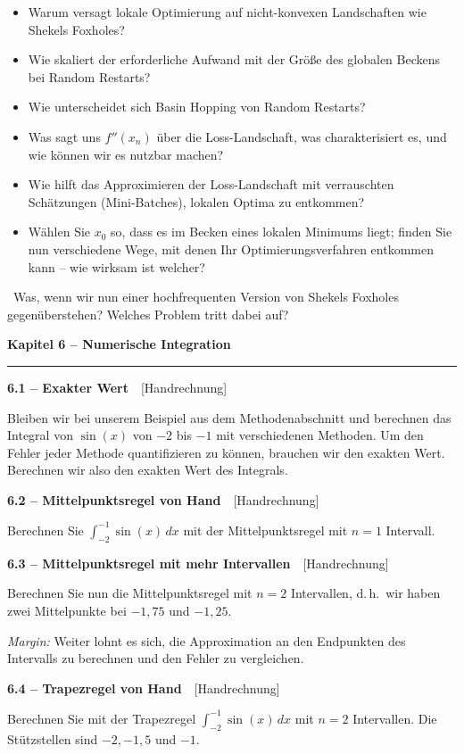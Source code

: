 \documentclass[a4paper,10pt]{article}
\newcommand{\kapitel}[1]{%
  \par\vspace{7pt}
  {\large\bfseries\color{accent} #1}\par
  \noindent\textcolor{accent}{\rule{\linewidth}{0.8pt}}\par\vspace{2pt}}
\newcommand{\aufg}[2]{%
  \par\vspace{3pt}
  {\bfseries\color{accent2} #1}~~{\footnotesize\color{accent2}[#2]}\par\vspace{1pt}}
\newcommand{\teaser}[1]{%
  \par\vspace{2pt}{\color{accent4}\textbf{Denkanstoß.}}~#1\par}
\newcommand{\reflexion}{%
  \par\vspace{2pt}{\bfseries\color{accent3} Selbstreflexionsfragen}\par\vspace{1pt}}
\begin{document}
\reflexion
\begin{itemize}
  \item Warum versagt lokale Optimierung auf nicht-konvexen Landschaften wie Shekels
        Foxholes?
  \item Wie skaliert der erforderliche Aufwand mit der Größe des globalen Beckens bei
        Random Restarts?
  \item Wie unterscheidet sich Basin Hopping von Random Restarts?
  \item Was sagt uns $f''(x_n)$ über die Loss-Landschaft, was charakterisiert es, und
        wie können wir es nutzbar machen?
  \item Wie hilft das Approximieren der Loss-Landschaft mit verrauschten Schätzungen
        (Mini-Batches), lokalen Optima zu entkommen?
  \item Wählen Sie $x_0$ so, dass es im Becken eines lokalen Minimums liegt; finden Sie
        nun verschiedene Wege, mit denen Ihr Optimierungsverfahren entkommen kann --
        wie wirksam ist welcher?
\end{itemize}

\teaser{Was, wenn wir nun einer hochfrequenten Version von Shekels Foxholes
gegenüberstehen? Welches Problem tritt dabei auf?}

\kapitel{Kapitel 6 \;--\; Numerische Integration}

\aufg{6.1 \;--\; Exakter Wert}{Handrechnung}
Bleiben wir bei unserem Beispiel aus dem Methodenabschnitt und berechnen das Integral
von $\sin(x)$ von $-2$ bis $-1$ mit verschiedenen Methoden. Um den Fehler jeder Methode
quantifizieren zu können, brauchen wir den exakten Wert. Berechnen wir also den exakten
Wert des Integrals.

\aufg{6.2 \;--\; Mittelpunktsregel von Hand}{Handrechnung}
Berechnen Sie $\int_{-2}^{-1}\sin(x)\,dx$ mit der Mittelpunktsregel mit $n=1$ Intervall.

\aufg{6.3 \;--\; Mittelpunktsregel mit mehr Intervallen}{Handrechnung}
Berechnen Sie nun die Mittelpunktsregel mit $n=2$ Intervallen, d.\,h.\ wir haben zwei
Mittelpunkte bei $-1{,}75$ und $-1{,}25$.
\par\textit{Margin:} Weiter lohnt es sich, die Approximation an den Endpunkten des
Intervalls zu berechnen und den Fehler zu vergleichen.

\aufg{6.4 \;--\; Trapezregel von Hand}{Handrechnung}
Berechnen Sie mit der Trapezregel $\int_{-2}^{-1}\sin(x)\,dx$ mit $n=2$ Intervallen.
Die Stützstellen sind $-2,-1{,}5$ und $-1$.
\end{document}

